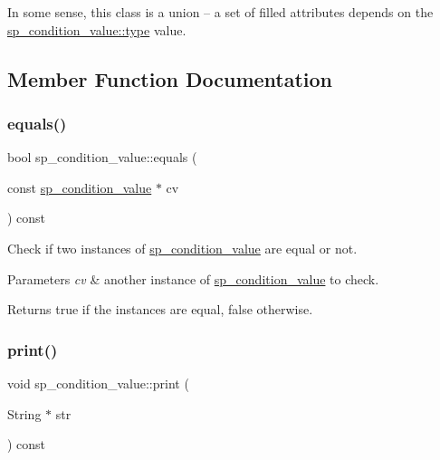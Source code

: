 In some sense, this class is a union -- a set of filled attributes depends on the \mbox{\hyperlink{classsp__condition__value_aba7838d59b7277fc23e19d091cf3ff1f}{sp\+\_\+condition\+\_\+value\+::type}} value. 

\subsection{Member Function Documentation}
\mbox{\label{classsp__condition__value_a35b9fba60f8d0d13142ebfc19968ea2d}} 
\subsubsection{\texorpdfstring{equals()}{equals()}}
{\footnotesize\ttfamily bool sp\+\_\+condition\+\_\+value\+::equals (\begin{DoxyParamCaption}\item[{const \mbox{\hyperlink{classsp__condition__value}{sp\+\_\+condition\+\_\+value}} $\ast$}]{cv }\end{DoxyParamCaption}) const}

Check if two instances of \mbox{\hyperlink{classsp__condition__value}{sp\+\_\+condition\+\_\+value}} are equal or not.


\begin{DoxyParams}{Parameters}
{\em cv} & another instance of \mbox{\hyperlink{classsp__condition__value}{sp\+\_\+condition\+\_\+value}} to check.\\
\hline
\end{DoxyParams}
\begin{DoxyReturn}{Returns}
true if the instances are equal, false otherwise. 
\end{DoxyReturn}
\mbox{\label{classsp__condition__value_aa6400b2ead821963ed73462ecd2f4f75}} 
\subsubsection{\texorpdfstring{print()}{print()}}
{\footnotesize\ttfamily void sp\+\_\+condition\+\_\+value\+::print (\begin{DoxyParamCaption}\item[{String $\ast$}]{str }\end{DoxyParamCaption}) const}

